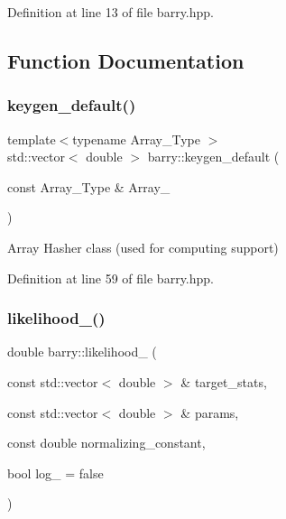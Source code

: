 Definition at line 13 of file barry.\+hpp.



\subsection{Function Documentation}
\mbox{\label{namespacebarry_a22bfc7c4a1f5b5922edfd1101b8ffe3d}} 
\subsubsection{\texorpdfstring{keygen\+\_\+default()}{keygen\_default()}}
{\footnotesize\ttfamily template$<$typename Array\+\_\+\+Type $>$ \\
std\+::vector$<$ double $>$ barry\+::keygen\+\_\+default (\begin{DoxyParamCaption}\item[{const Array\+\_\+\+Type \&}]{Array\+\_\+ }\end{DoxyParamCaption})\hspace{0.3cm}{\ttfamily [inline]}}



Array Hasher class (used for computing support) 



Definition at line 59 of file barry.\+hpp.

\mbox{\label{namespacebarry_a1dcc0a46544cc9733ca8ee5619ef6d20}} 
\subsubsection{\texorpdfstring{likelihood\+\_\+()}{likelihood\_()}}
{\footnotesize\ttfamily double barry\+::likelihood\+\_\+ (\begin{DoxyParamCaption}\item[{const std\+::vector$<$ double $>$ \&}]{target\+\_\+stats,  }\item[{const std\+::vector$<$ double $>$ \&}]{params,  }\item[{const double}]{normalizing\+\_\+constant,  }\item[{bool}]{log\+\_\+ = {\ttfamily false} }\end{DoxyParamCaption})\hspace{0.3cm}{\ttfamily [inline]}}



